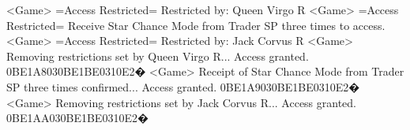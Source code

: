<Game> =Access Restricted= Restricted by: Queen Virgo R 
<Game> =Access Restricted= 
Receive Star Chance Mode from Trader SP three times to access. 
<Game> =Access Restricted= Restricted by: Jack Corvus R 
<Game> Removing restrictions set by Queen Virgo R... Access granted. 
{0B}{E1}{A8}{03}{0B}{E1}{BE}{03}{10}{E2}�
<Game> Receipt of Star Chance Mode from Trader SP three times confirmed... 
Access granted. 
{0B}{E1}{A9}{03}{0B}{E1}{BE}{03}{10}{E2}�
<Game> Removing restrictions set by Jack Corvus R... Access granted. 
{0B}{E1}{AA}{03}{0B}{E1}{BE}{03}{10}{E2}�
